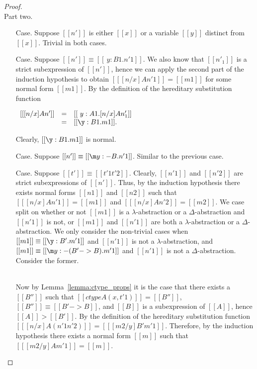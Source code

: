 \begin{proof}
  \ \\
  \noindent Part two.
  \begin{itemize}
  \item[Case.] Suppose $[[n']]$ is either $[[x]]$ or a variable $[[y]]$ distinct from $[[x]]$.  
    Trivial in both cases.

  \item[Case.] Suppose $[[n']] \equiv [[\ y:B1.n'1]]$.  
    We also know that $[[n'_1]]$ is a strict subexpression of $[[n']]$, hence we can apply the second part of the
    induction hypothesis to obtain
    $[[ [n/x] A n'1]] = [[m1]]$ for some normal form $[[m1]]$.  
    By the definition of the hereditary substitution function 
    \begin{center}
      \begin{math}
        \begin{array}{lll}
          [[ [n/x] A n']] & = & [[\ y:A1.[n/x] A n'_1]] \\
          & = & [[\y:B1.m1]].
        \end{array}
      \end{math}
    \end{center}
    Clearly, $[[\y:B1.m1]]$ is normal.
    
  \item[Case.] Suppose $[[n']] \equiv [[\m y:{-B}.n'1]]$.  Similar to the previous case.

  \item[Case.] Suppose $[[t']] \equiv [[t'1 t'2]]$.
    Clearly, $[[n'1]]$ and $[[n'2]]$ are strict subexpressions of $[[n']]$.  Thus, by the 
    induction hypothesis there exists normal forms $[[n1]]$ and $[[n2]]$ such that 
    $[[ [n/x] A n'1]] = [[m1]]$ and
    $[[ [n/x] A n'2]] = [[m2]]$.
    We case split on whether or not $[[m1]]$ is a $\lambda$-abstraction or
    a $\Delta$-abstraction and $[[n'1]]$ is not, or $[[m1]]$ and $[[n'1]]$ are both a 
    $\lambda$-abstraction or a $\Delta$-abstraction.  
    We only consider the non-trivial cases when $[[m1]] \equiv [[\y:B'.m'1]]$ and 
    $[[n'1]]$ is not a 
    $\lambda$-abstraction, and $[[m1]] \equiv [[\m y:{-(B'->B)}.m'1]]$ and $[[n'1]]$ is not a 
    $\Delta$-abstraction.  Consider the former.

    \ \\
    Now by Lemma~\ref{lemma:ctype_props} it is the case that 
    there exists a $[[B'']]$ such that $[[ctype A (x,t'1)]] = [[B'']]$, 
    $[[B'']] \equiv [[B' -> B]]$, and $[[B]]$ is a subexpression of $[[A]]$, hence
    $[[A]] > [[B']]$.  By the definition of the hereditary substitution function
    $[[ [n/x] A (n'1 n'2)]] = [[ [m2/y] B' m'1]]$. Therefore, by the induction hypothesis there 
    exists a 
    normal form $[[m]]$ such that $[[ [m2/y] A m'1]] = [[m]]$.


\end{itemize}
\end{proof}
